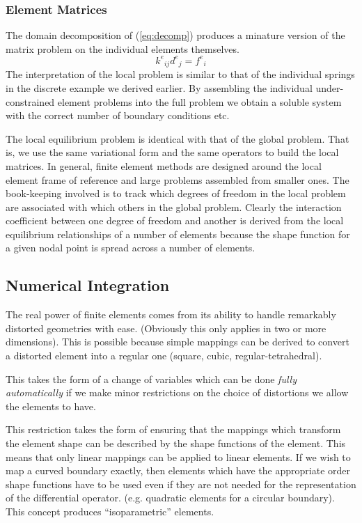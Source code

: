 \documentclass[10pt]{article}
\begin{document}
	\subsubsection{Element Matrices}
		
		The domain decomposition of (\ref{eq:decomp}) produces 
		a minature version of the matrix problem on the individual
		elements themselves.
			\begin{equation}
					{k^e}_{ij} {d^e}_j = {f^e}_i
			\end{equation}
		The interpretation of the local problem is similar to 
		that of the individual springs in the discrete example 
		we derived earlier. By assembling the 
		individual under-constrained element problems into the
		full problem we obtain a soluble system with the 
		correct number of boundary conditions etc.
	
		The local equilibrium problem is identical with 
		that of the global problem. That is, we use the
		same variational form and the same operators to 
		build the local matrices. In general, finite element
		methods are designed around the local element frame
		of reference and large problems assembled from 
		smaller ones. The book-keeping involved is to 
		track which degrees of freedom in the local 
		problem are associated with which others
		in the global problem. Clearly the 
		interaction coefficient between one degree of 
		freedom and another is derived from the local
		equilibrium relationships of a number of elements
		because the shape function for a given nodal 
		point is spread across a number of elements.

	\subsection{Numerical Integration}
	
		The real power of finite elements comes from its
		ability to handle remarkably distorted geometries
		with ease. (Obviously this only applies in two or
		more dimensions).
		This is possible because simple mappings
		can be derived to convert a distorted element
		into a regular one (square, cubic, regular-tetrahedral). 
		
		This takes the form of a change of variables which 
		can be done {\em fully automatically} if we make
		minor restrictions on the choice of distortions we allow the
		elements to have. 
		
		This restriction takes the form of ensuring that the
		mappings which transform the element shape can be 
		described by the shape functions of the element. This means
		that only linear mappings can be applied to linear elements. 
		If we wish to map a curved boundary exactly, then elements
		which have the appropriate order shape functions have to be
		used even if they are not needed for the representation of the 
		differential operator. (e.g. quadratic elements for a circular
		boundary). This concept produces ``isoparametric'' elements.
		
\end{document}
